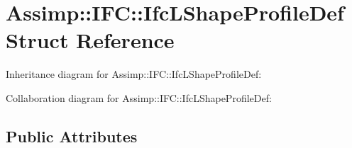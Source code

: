 \hypertarget{struct_assimp_1_1_i_f_c_1_1_ifc_l_shape_profile_def}{\section{Assimp\+:\+:I\+F\+C\+:\+:Ifc\+L\+Shape\+Profile\+Def Struct Reference}
\label{struct_assimp_1_1_i_f_c_1_1_ifc_l_shape_profile_def}
}


Inheritance diagram for Assimp\+:\+:I\+F\+C\+:\+:Ifc\+L\+Shape\+Profile\+Def\+:


Collaboration diagram for Assimp\+:\+:I\+F\+C\+:\+:Ifc\+L\+Shape\+Profile\+Def\+:
\subsection*{Public Attributes}
